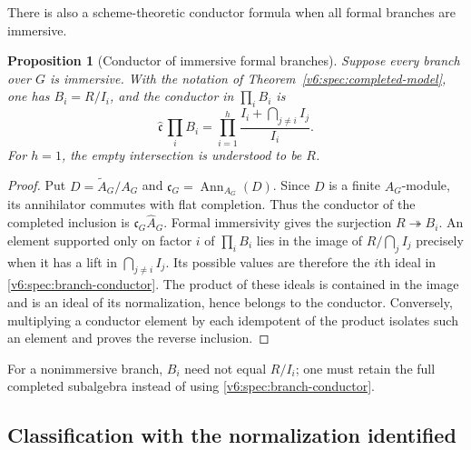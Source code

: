 \documentclass[10pt,fleqn]{article}
\numberwithin{equation}{section}
\newtheorem{proposition}[theorem]{Proposition}
\begin{document}
There is also a scheme-theoretic conductor formula when all formal
branches are immersive.

\begin{proposition}[Conductor of immersive formal branches]
\label{v6:spec:immersive-conductor}
Suppose every branch over $G$ is immersive.  With the notation of
Theorem~\ref{v6:spec:completed-model}, one has $B_i=R/I_i$, and the
conductor in $\prod_i B_i$ is
\begin{equation}\label{v6:spec:branch-conductor}
 \widehat{\mathfrak c}\,\prod_iB_i
 =\prod_{i=1}^h
 \frac{I_i+\bigcap_{j\ne i}I_j}{I_i}.
\end{equation}
For $h=1$, the empty intersection is understood to be $R$.
\end{proposition}

\begin{proof}
Put $D=\widetilde A_G/A_G$ and
$\mathfrak c_G=\operatorname{Ann}_{A_G}(D)$.
Since $D$ is a finite $A_G$-module, its annihilator commutes
with flat completion.  Thus the conductor of the completed
inclusion is $\mathfrak c_G\widehat A_G$.
Formal immersivity gives the surjection $R\twoheadrightarrow B_i$.
An element supported only on factor $i$ of $\prod_iB_i$ lies in the
image of $R/\bigcap_jI_j$ precisely when it has a lift in
$\bigcap_{j\ne i}I_j$.  Its possible values are therefore the $i$th
ideal in \eqref{v6:spec:branch-conductor}.  The product of these ideals
is contained in the image and is an ideal of its normalization, hence
belongs to the conductor.  Conversely, multiplying a conductor element
by each idempotent of the product isolates such an element and proves
the reverse inclusion.
\end{proof}

For a nonimmersive branch, $B_i$ need not equal $R/I_i$; one must
retain the full completed subalgebra instead of using
\eqref{v6:spec:branch-conductor}.

\subsection{Classification with the normalization identified}
\label{r20:spec:classification-route}
\end{document}
